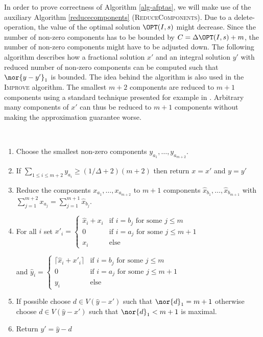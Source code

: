 In order to prove correctness of Algorithm \ref{alg-afptas}, we will make use of the auxiliary Algorithm \ref{reducecomponents} (\textsc{ReduceComponents}). Due to a delete-operation, the value of the optimal solution $\OPT(I,s)$ might decrease. Since the number of non-zero components has to be bounded by $C = \Delta \OPT(I,s) + m$, the number of non-zero components might have to be adjusted down. The following algorithm describes how a fractional solution $x'$ and an integral solution $y'$ with reduced number of non-zero components can be computed such that $\nor{y-y'}_1$ is bounded. The idea behind the algorithm is also used in the \textsc{Improve} algorithm. The smallest $m+2$ components are reduced to $m+1$ components using a standard technique presented for example in \cite{beling1998}. Arbitrary many components of $x'$ can thus be reduced to $m+1$ components without making the approximation guarantee worse.
\begin{algo}\label{reducecomponents}
\ 
  \begin{enumerate}
  \item Choose the smallest non-zero components $y_{a_1}, \ldots , y_{a_{m+2}}$.
  \item If $\sum_{1\leq i \leq m+2} y_{a_i} \geq (1/ \Delta +2)(m+2)$ then return $x=x'$ and $y=y'$
  
  \item Reduce the components $x_{a_1}, \ldots , x_{a_{m+2}}$ to $m+1$ components $\hat{x}_{b_1}, \ldots , \hat{x}_{b_{m+1}}$ with $\sum_{j=1}^{m+2}x_{a_{j}}=\sum_{j=1}^{m+1}\hat{x}_{b_{j}}$.
  \item For all $i $ set $x'_i = 
	\begin{cases} \hat{x}_i +x_i & \text{if $i= b_j$ for some } j \leq m \\
	0 & \text{if $i= a_j$ for some } j \leq m+1 \\
	x_i & \text{else}
	\end{cases}$ 
	 
	
    and $\hat{y}_i = 	\begin{cases} \lceil \hat{x}_i + x'_i \rceil & \text{if $i= b_j$ for some } j \leq m \\
 	0 & \text{if $i= a_j$ for some } j \leq m+1 \\
	y_i & \text{else}
	\end{cases}$
  \item If possible choose $d \in V(\hat{y}-x')$ such that $\nor{d}_1 = m+1$ otherwise
  choose $d \in V(\hat{y}-x')$ such that $\nor{d}_1 < m+1$ is maximal.
  \item Return $y' = \hat{y} -d$
  \end{enumerate}
\end{algo}
